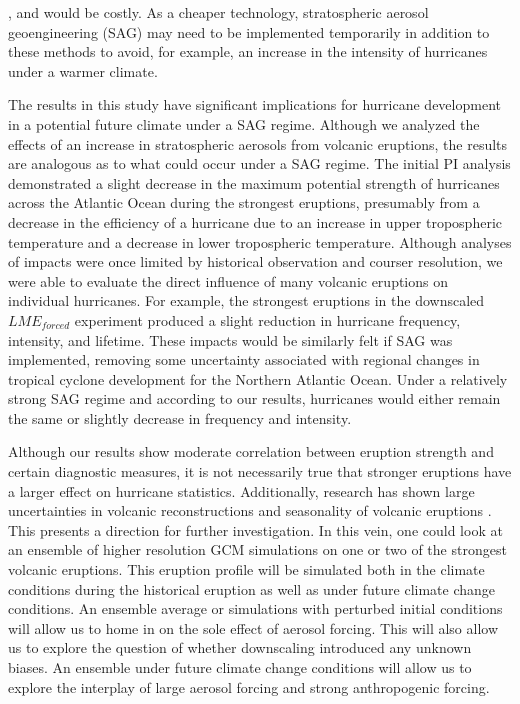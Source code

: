 \documentclass[smallextended]{svjour3}       %
\begin{document}
\cite{united2017emissions}, and would be costly. As a cheaper technology, 
stratospheric aerosol geoengineering (SAG) may need to be implemented 
temporarily in addition to these methods to avoid, for example, an increase 
in the intensity of hurricanes under a warmer climate. 
\par
The results in this study have significant implications for hurricane 
development in a potential future climate under a SAG regime.  Although we 
analyzed the effects of an increase in stratospheric aerosols from volcanic 
eruptions, the results are analogous as to what could occur under a SAG regime. 
The initial PI analysis demonstrated a slight decrease in the maximum potential 
strength of hurricanes across the Atlantic Ocean during the strongest eruptions, 
presumably from a decrease in the efficiency of a hurricane due to an increase 
in upper tropospheric temperature and a decrease in lower tropospheric 
temperature. Although analyses of impacts were once limited by historical 
observation and courser resolution, we were able to evaluate the direct 
influence of many volcanic eruptions on individual hurricanes.  For example, 
the strongest eruptions in the downscaled $LME_{forced}$ experiment produced 
a slight reduction in hurricane frequency, intensity, and lifetime. These 
impacts would be similarly felt if SAG was implemented, removing some 
uncertainty associated with regional changes in tropical cyclone development 
for the Northern Atlantic Ocean. Under a relatively strong SAG regime and 
according to our results, hurricanes would either remain the same or slightly 
decrease in frequency and intensity.
\par
Although our results show moderate correlation between eruption strength and 
certain diagnostic measures, it is not necessarily true that stronger 
eruptions have a larger effect on hurricane statistics. Additionally, research 
has shown large uncertainties in volcanic reconstructions and seasonality of 
volcanic eruptions \cite{schmidt2012climate,schmidt2011climate,stevenson2017role,raible2016tambora}. This presents a direction for further investigation. 
In this vein, one could look at an ensemble of higher resolution GCM simulations 
on one or two of the strongest volcanic eruptions. This eruption profile 
will be simulated both in the climate conditions during the historical eruption 
as well as under future climate change conditions. An ensemble average or 
simulations with perturbed initial conditions will allow us to home in on the 
sole effect of aerosol forcing. This will also allow us to explore the 
question of whether downscaling introduced any unknown biases. An ensemble 
under future climate change conditions will allow us to explore the interplay 
of large aerosol forcing and strong anthropogenic forcing.    
\par
\end{document}
